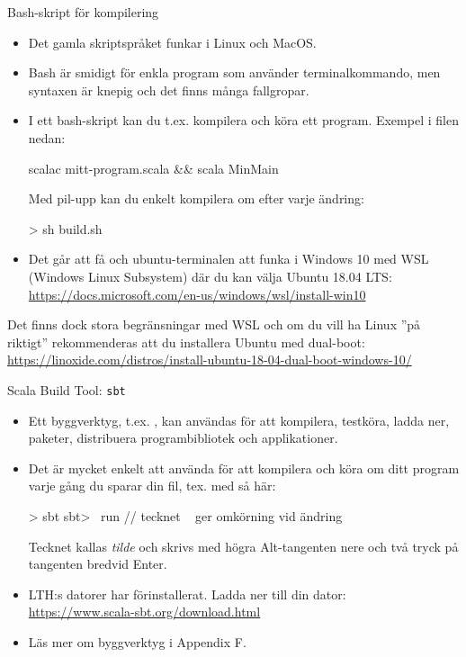 \begin{Slide}{Bash-skript för kompilering}\SlideFontSmall
	\begin{itemize}
		\item Det gamla skriptspråket  funkar i Linux och MacOS.
		\item Bash är smidigt för enkla program som använder terminalkommando, men syntaxen är knepig och det finns många fallgropar.
		\item I ett bash-skript kan du t.ex. kompilera och köra ett program. Exempel i filen  nedan:
		      \begin{Code}
			      scalac mitt-program.scala && scala MinMain
		      \end{Code}
		      Med pil-upp kan du enkelt kompilera om efter varje ändring:
		      \begin{REPLnonum}
			      > sh build.sh
		      \end{REPLnonum}
		\item Det går att få  och ubuntu-terminalen att funka i Windows 10 med WSL (Windows Linux Subsystem) där du kan välja Ubuntu 18.04 LTS: \\
		      {\SlideFontTiny\url{https://docs.microsoft.com/en-us/windows/wsl/install-win10}}
	\end{itemize}
	{\noindent   Det finns dock stora begränsningar med WSL och om du vill ha Linux ''på riktigt'' rekommenderas att du installera Ubuntu med dual-boot: \SlideFontTiny\url{https://linoxide.com/distros/install-ubuntu-18-04-dual-boot-windows-10/}}
\end{Slide}

\begin{Slide}{Scala Build Tool: \texttt{sbt}}
	\begin{itemize}
		\item Ett byggverktyg, t.ex. , kan användas för att kompilera, testköra, ladda ner, paketer, distribuera programbibliotek och applikationer.
		\item Det är mycket enkelt att använda  för att kompilera och köra om ditt program varje gång du sparar din fil, tex. med  så här:
		      \begin{REPLnonum}
			      > sbt
			      sbt> ~run   // tecknet ~ ger omkörning vid ändring
		      \end{REPLnonum}
		      Tecknet \code{~} kallas \emph{tilde} och skrivs med högra Alt-tangenten nere och två tryck på tangenten bredvid Enter.
		\item LTH:s datorer har  förinstallerat. Ladda ner till din dator: \\
		      \url{https://www.scala-sbt.org/download.html}
		\item Läs mer om byggverktyg i Appendix F.

	\end{itemize}

\end{Slide}

